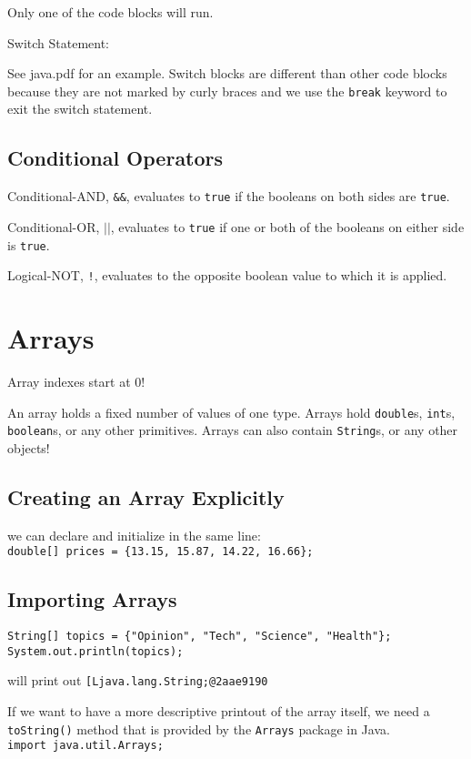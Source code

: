 \documentclass[a4paper, 12pt]{article}
\begin{document}
Only one of the code blocks will run.

\vspace{1.3em}

Switch Statement:

See java.pdf for an example. Switch blocks are different than other code blocks because they are not marked by curly braces and we use the \verb|break| keyword to exit the switch statement.

\subsection{Conditional Operators}
Conditional-AND, \verb|&&|, evaluates to \verb|true| if the booleans on both sides are \verb|true|.

Conditional-OR, $\vert\vert$, evaluates to \verb|true| if one or both of the booleans on either side is \verb|true|.

Logical-NOT, \verb|!|, evaluates to the opposite boolean value to which it is applied.


\section{Arrays}
Array indexes start at 0!

An array holds a fixed number of values of one type. Arrays hold \verb|double|s, \verb|int|s, \verb|boolean|s, or any other primitives. Arrays can also contain \verb|String|s, or any other objects!

\subsection{Creating an Array Explicitly}
we can declare and initialize in the same line:\\
\verb|double[] prices = {13.15, 15.87, 14.22, 16.66};|

\subsection{Importing Arrays}
\begin{verbatim}
String[] topics = {"Opinion", "Tech", "Science", "Health"};
System.out.println(topics);
\end{verbatim}
will print out \verb|[Ljava.lang.String;@2aae9190|

If we want to have a more descriptive printout of the array itself, we need a \verb|toString()| method that is provided by the \verb|Arrays| package in Java.\\
\verb|import java.util.Arrays;|
\end{document}
